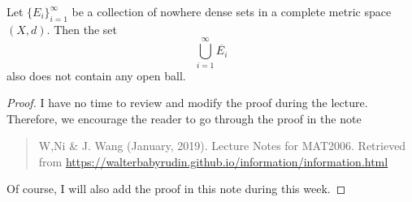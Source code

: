 \begin{theorem}
Let $\{E_i\}_{i=1}^\infty$ be a collection of nowhere dense sets in a complete metric space $(X,d)$. 
Then the set
\[
\bigcup_{i=1}^\infty \overline{E_i}
\]
also does not contain any open ball.
\end{theorem}
\begin{proof}
I have no time to review and modify the proof during the lecture. Therefore, we encourage the reader to go through the proof in the note
\begin{quotation}
W,Ni \& J. Wang (January, 2019). Lecture Notes for MAT2006. Retrieved from 
\url{https://walterbabyrudin.github.io/information/information.html}
\end{quotation}
Of course, I will also add the proof in this note during this week.
%
%
\end{proof}

































